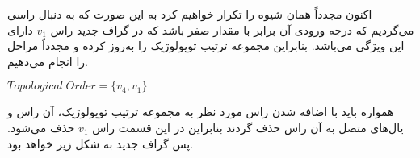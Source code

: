 \documentclass[a4paper,10pt]{article}
\begin{document}
    \begin{center}
        

    \end{center}

    اکنون مجدداً همان شیوه را تکرار خواهیم کرد به این صورت که به دنبال راسی می‌گردیم که درجه ورودی آن برابر با مقدار صفر باشد که در گراف جدید راس $v_1$ دارای این ویژگی می‌باشد. بنابراین مجموعه ترتیب توپولوژیک را به‌روز کرده و مجدداً مراحل را انجام می‌دهیم.

    \begin{center}
        
        $Topological \hspace{3pt} Order = \{v_4, v_1\}$

    \end{center}

    همواره باید با اضافه شدن راس مورد نظر به مجموعه ترتیب توپولوژیک، آن راس و یال‌های متصل به آن راس حذف گردند بنابراین در این قسمت راس $v_1$ حذف می‌شود. پس گراف جدید به شکل زیر خواهد بود.

    \begin{center}
        

    \end{center}
\end{document}
